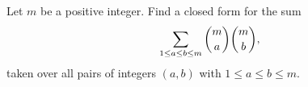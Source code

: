 Let $m$ be a positive integer. Find a closed form for the sum
\[\sum_{1\le a\le b\le m}\dbinom ma\dbinom mb,\]
taken over all pairs of integers $(a,b)$ with $1\le a\le b\le m$.
